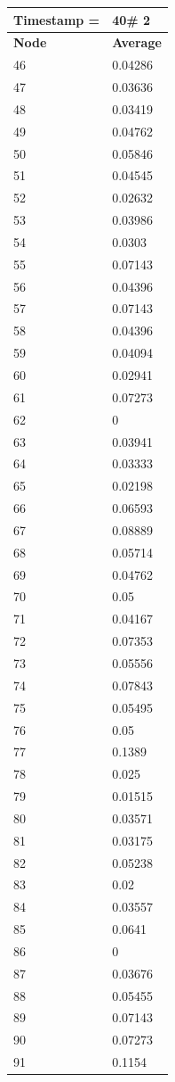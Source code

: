 \begin{tabular}{|l||l|}
\hline
\textbf{Timestamp =} & \textbf{40}\# 2\\\hline
	\textbf{Node} & \textbf{Average} \\ \hline
\hline
	46 & 0.04286 \\ \hline
	47 & 0.03636 \\ \hline
	48 & 0.03419 \\ \hline
	49 & 0.04762 \\ \hline
	50 & 0.05846 \\ \hline
	51 & 0.04545 \\ \hline
	52 & 0.02632 \\ \hline
	53 & 0.03986 \\ \hline
	54 & 0.0303 \\ \hline
	55 & 0.07143 \\ \hline
	56 & 0.04396 \\ \hline
	57 & 0.07143 \\ \hline
	58 & 0.04396 \\ \hline
	59 & 0.04094 \\ \hline
	60 & 0.02941 \\ \hline
	61 & 0.07273 \\ \hline
	62 & 0 \\ \hline
	63 & 0.03941 \\ \hline
	64 & 0.03333 \\ \hline
	65 & 0.02198 \\ \hline
	66 & 0.06593 \\ \hline
	67 & 0.08889 \\ \hline
	68 & 0.05714 \\ \hline
	69 & 0.04762 \\ \hline
	70 & 0.05 \\ \hline
	71 & 0.04167 \\ \hline
	72 & 0.07353 \\ \hline
	73 & 0.05556 \\ \hline
	74 & 0.07843 \\ \hline
	75 & 0.05495 \\ \hline
	76 & 0.05 \\ \hline
	77 & 0.1389 \\ \hline
	78 & 0.025 \\ \hline
	79 & 0.01515 \\ \hline
	80 & 0.03571 \\ \hline
	81 & 0.03175 \\ \hline
	82 & 0.05238 \\ \hline
	83 & 0.02 \\ \hline
	84 & 0.03557 \\ \hline
	85 & 0.0641 \\ \hline
	86 & 0 \\ \hline
	87 & 0.03676 \\ \hline
	88 & 0.05455 \\ \hline
	89 & 0.07143 \\ \hline
	90 & 0.07273 \\ \hline
	91 & 0.1154 \\ \hline
\end{tabular}
